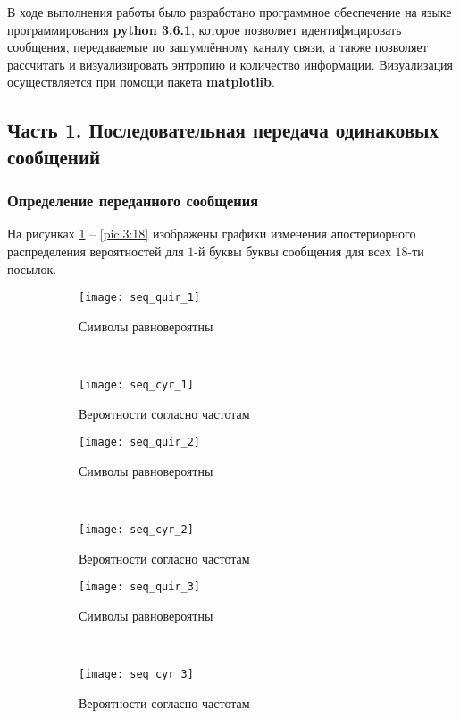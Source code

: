 В ходе выполнения работы было разработано программное обеспечение на языке программирования \textbf{python 3.6.1}, которое позволяет идентифицировать сообщения, передаваемые по зашумлённому каналу связи, а также позволяет рассчитать и визуализировать энтропию и количество информации. Визуализация осуществляется при помощи пакета \textbf{matplotlib}.

\subsection{Часть 1. Последовательная передача одинаковых сообщений}

\subsubsection{Определение переданного сообщения}

На рисунках \ref{pic:3:1} -- \ref{pic:3:18} изображены графики изменения апостериорного распределения вероятностей для $1$-й буквы буквы сообщения для всех $18$-ти посылок.

\begin{figure}[H]
\begin{center}
	\begin{subfigure}[b]{0.45\textwidth}
		\texttt{[image: seq\_quir\_1]}
		\caption{Символы равновероятны}
	\end{subfigure}
	~
	\begin{subfigure}[b]{0.45\textwidth}
		\texttt{[image: seq\_cyr\_1]}
		\caption{Вероятности согласно частотам}
	\end{subfigure}
	\caption{}
	\label{pic:3:1}
\end{center}
\end{figure}

\begin{figure}[H]
\begin{center}
	\begin{subfigure}[b]{0.45\textwidth}
		\texttt{[image: seq\_quir\_2]}
		\caption{Символы равновероятны}
	\end{subfigure}
	~
	\begin{subfigure}[b]{0.45\textwidth}
		\texttt{[image: seq\_cyr\_2]}
		\caption{Вероятности согласно частотам}
	\end{subfigure}
	\caption{}
\end{center}
\end{figure}

\begin{figure}[H]
\begin{center}
	\begin{subfigure}[b]{0.45\textwidth}
		\texttt{[image: seq\_quir\_3]}
		\caption{Символы равновероятны}
	\end{subfigure}
	~
	\begin{subfigure}[b]{0.45\textwidth}
		\texttt{[image: seq\_cyr\_3]}
		\caption{Вероятности согласно частотам}
	\end{subfigure}
	\caption{}
\end{center}
\end{figure}

